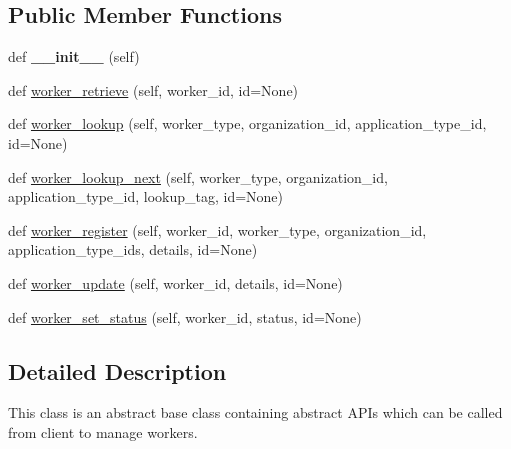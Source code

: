 \subsection*{Public Member Functions}
\begin{DoxyCompactItemize}
\item 
\mbox{\label{classavalon__sdk_1_1connector_1_1interfaces_1_1worker__registry_1_1WorkerRegistry_ae756eb61dbb8c57d2cbd4eca778516be}} 
def {\bfseries \+\_\+\+\_\+init\+\_\+\+\_\+} (self)
\item 
def \hyperlink{classavalon__sdk_1_1connector_1_1interfaces_1_1worker__registry_1_1WorkerRegistry_a2798a353672a2c5b154b3e856d00af02}{worker\+\_\+retrieve} (self, worker\+\_\+id, id=None)
\item 
def \hyperlink{classavalon__sdk_1_1connector_1_1interfaces_1_1worker__registry_1_1WorkerRegistry_a4fecd9bcfee5bbb95655549fb080016d}{worker\+\_\+lookup} (self, worker\+\_\+type, organization\+\_\+id, application\+\_\+type\+\_\+id, id=None)
\item 
def \hyperlink{classavalon__sdk_1_1connector_1_1interfaces_1_1worker__registry_1_1WorkerRegistry_ad488bae810e46e1222aa90db25b9aa18}{worker\+\_\+lookup\+\_\+next} (self, worker\+\_\+type, organization\+\_\+id, application\+\_\+type\+\_\+id, lookup\+\_\+tag, id=None)
\item 
def \hyperlink{classavalon__sdk_1_1connector_1_1interfaces_1_1worker__registry_1_1WorkerRegistry_a801481926e5dc9fc36ce7ec5a8166629}{worker\+\_\+register} (self, worker\+\_\+id, worker\+\_\+type, organization\+\_\+id, application\+\_\+type\+\_\+ids, details, id=None)
\item 
def \hyperlink{classavalon__sdk_1_1connector_1_1interfaces_1_1worker__registry_1_1WorkerRegistry_af19b8ace10ce24494c6525a594fdbc57}{worker\+\_\+update} (self, worker\+\_\+id, details, id=None)
\item 
def \hyperlink{classavalon__sdk_1_1connector_1_1interfaces_1_1worker__registry_1_1WorkerRegistry_aeb047c0d5a9f4bacc7ce51b81f883b27}{worker\+\_\+set\+\_\+status} (self, worker\+\_\+id, status, id=None)
\end{DoxyCompactItemize}


\subsection{Detailed Description}
\begin{DoxyVerb}This class is an abstract base class containing abstract APIs
which can be called from client to manage workers.
\end{DoxyVerb}
 

